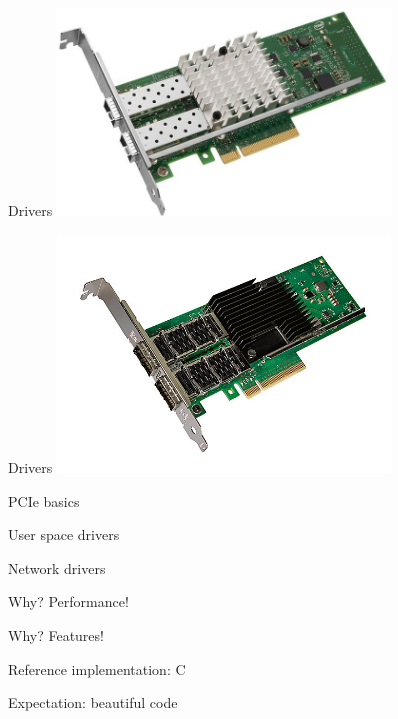 \documentclass[NET,english,aspectratio=169,notitleframe]{tumbeamer}
\begin{document}
\begin{frame}{Drivers}
\centering\includegraphics[width=0.66\textwidth]{pics/nic2}
\end{frame}

\begin{frame}{Drivers}
\centering\includegraphics[width=0.66\textwidth]{pics/nic3}
\end{frame}

\begin{frame}{PCIe basics}
\end{frame}

\begin{frame}{User space drivers}
\end{frame}

\begin{frame}{Network drivers}
\end{frame}

\begin{frame}{Why? Performance!}
\end{frame}

\begin{frame}{Why? Features!}
\end{frame}

\begin{frame}{Reference implementation: C}
\end{frame}

\begin{frame}{Expectation: beautiful code}
\end{frame}
\end{document}
